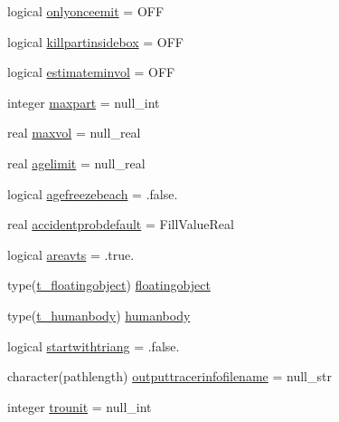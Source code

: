\begin{DoxyCompactItemize}
\item 
logical \mbox{\hyperlink{structmodulelagrangianglobal_1_1t__origin_ab615231e5e674524fd2d20aeafd05660}{onlyonceemit}} = O\+FF
\item 
logical \mbox{\hyperlink{structmodulelagrangianglobal_1_1t__origin_ab30bfc49c7dc6b8b5396c59eefb5b713}{killpartinsidebox}} = O\+FF
\item 
logical \mbox{\hyperlink{structmodulelagrangianglobal_1_1t__origin_a3e3901c7a7050144b70c4f8f2b383f44}{estimateminvol}} = O\+FF
\item 
integer \mbox{\hyperlink{structmodulelagrangianglobal_1_1t__origin_ada0c1f486a643c15ce0c59c1168fe49f}{maxpart}} = null\+\_\+int
\item 
real \mbox{\hyperlink{structmodulelagrangianglobal_1_1t__origin_a0d6dafacbf8451884b418b99a8dd39c9}{maxvol}} = null\+\_\+real
\item 
real \mbox{\hyperlink{structmodulelagrangianglobal_1_1t__origin_a621bfd32aad2f7f8c16840106f3f275b}{agelimit}} = null\+\_\+real
\item 
logical \mbox{\hyperlink{structmodulelagrangianglobal_1_1t__origin_ae46e5a9640d4627f75d12bfa80ecaa9c}{agefreezebeach}} = .false.
\item 
real \mbox{\hyperlink{structmodulelagrangianglobal_1_1t__origin_a5f53eabcb8bd710a5022e3e144ef7c9a}{accidentprobdefault}} = Fill\+Value\+Real
\item 
logical \mbox{\hyperlink{structmodulelagrangianglobal_1_1t__origin_a6b80f0d8eaa9dfb23faea5882048c4a7}{areavts}} = .true.
\item 
type(\mbox{\hyperlink{structmodulelagrangianglobal_1_1t__floatingobject}{t\+\_\+floatingobject}}) \mbox{\hyperlink{structmodulelagrangianglobal_1_1t__origin_a08ef8a02fc7a90af0fb6e678ab465010}{floatingobject}}
\item 
type(\mbox{\hyperlink{structmodulelagrangianglobal_1_1t__humanbody}{t\+\_\+humanbody}}) \mbox{\hyperlink{structmodulelagrangianglobal_1_1t__origin_a3f26f69cfc68e3c0764299f67fe22086}{humanbody}}
\item 
logical \mbox{\hyperlink{structmodulelagrangianglobal_1_1t__origin_ad90a39d3dd067f73c5aac938f03530e3}{startwithtriang}} = .false.
\item 
character(pathlength) \mbox{\hyperlink{structmodulelagrangianglobal_1_1t__origin_a9428e39c52c9ecf2107da484c207a756}{outputtracerinfofilename}} = null\+\_\+str
\item 
integer \mbox{\hyperlink{structmodulelagrangianglobal_1_1t__origin_a0bddd504b99c69d1ebcdc1a51b45744e}{trounit}} = null\+\_\+int

\end{DoxyCompactItemize}
